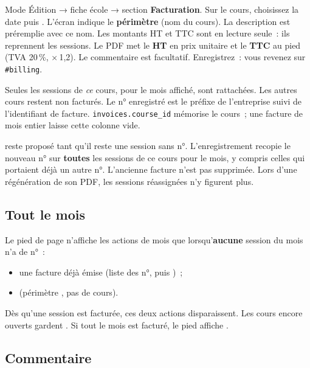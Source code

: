 \begin{workflowstep}
  Mode Édition → fiche école → section \textbf{Facturation}. Sur le cours, choisissez la date puis .
  L'écran indique le \textbf{périmètre} (nom du cours). La description est préremplie avec ce nom.
  Les montants HT et TTC sont en lecture seule~: ils reprennent les sessions. Le PDF met le \textbf{HT} en prix unitaire et le \textbf{TTC} au pied (TVA 20\,\%, ×\,1{,}2).
  Le commentaire est facultatif. Enregistrez~: vous revenez sur \texttt{\#billing}.
\end{workflowstep}

Seules les sessions de \emph{ce} cours, pour le mois affiché, sont rattachées. Les autres cours restent non facturés. Le n° enregistré est le préfixe de l'entreprise suivi de l'identifiant de facture. \texttt{invoices.course\_id} mémorise le cours~; une facture de mois entier laisse cette colonne vide.

\begin{avertissement}
   reste proposé tant qu'il reste une session sans n°.
  L'enregistrement recopie le nouveau n° sur \textbf{toutes} les sessions de ce cours pour le mois, y compris celles qui portaient déjà un autre n°.
  L'ancienne facture n'est pas supprimée. Lors d'une régénération de son PDF, les sessions réassignées n'y figurent plus.
\end{avertissement}

\subsection{Tout le mois}

Le pied de page n'affiche les actions de mois que lorsqu'\textbf{aucune} session du mois n'a de n°~:

\begin{itemize}[leftmargin=*]
  \item {} une facture déjà émise (liste des n°, puis )~;
  \item {} (périmètre , pas de cours).
\end{itemize}

Dès qu'une session est facturée, ces deux actions disparaissent. Les cours encore ouverts gardent . Si tout le mois est facturé, le pied affiche .

\subsection{Commentaire}

